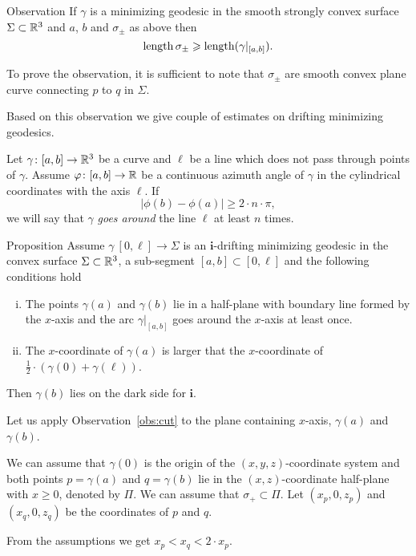 \documentclass[a4paper,10pt]{article}
\begin{document}
\begin{thm}{Observation}\label{obs:cut}
If $\gamma$ is a minimizing geodesic in the smooth strongly convex surface $\Sigma\subset \mathbb{R}^3$ and $a$, $b$ and $\sigma_\pm$ as above then
\[\mathop{\rm length}\nolimits\sigma_\pm\geqslant\mathop{\rm length}\nolimits(\gamma|_{[a,b]}).\]
\end{thm}

To prove the observation, it is sufficient to note that $\sigma_\pm$ are  smooth convex plane curve connecting $p$ to $q$ in $\Sigma$.

Based on this observation we give couple of estimates on drifting minimizing geodesics.

Let $\gamma\colon[a,b]\to\mathbb{R}^3$ be a curve and $\ell$ be a line which does not pass through points of $\gamma$.
Assume $\varphi\colon[a,b]\to\mathbb{R}$ be a continuous azimuth angle
of $\gamma$ in the cylindrical coordinates with the axis $\ell$.
If 
\[|\phi(b)-\phi(a)|\ge 2\cdot n\cdot\pi,\]
we will say that $\gamma$ \emph{goes around} the line $\ell$
at least $n$ times.

\begin{thm}{Proposition}\label{prop:around-once}
Assume $\gamma\:[0,\ell]\to \Sigma$ is an $\bm{i}$-drifting minimizing geodesic in the convex surface $\Sigma\subset \mathbb{R}^3$, a sub-segment $[a,b]\subset [0,\ell]$ and the following conditions hold
\begin{enumerate}[(i)]
\item The points $\gamma(a)$ and $\gamma(b)$ lie in a half-plane with boundary line formed by the $x$-axis
and  the arc $\gamma|_{[a,b]}$ goes around the $x$-axis at least once.
\item  The $x$-coordinate of $\gamma(a)$ is larger that the $x$-coordinate of $\tfrac12\cdot(\gamma(0)+\gamma(\ell))$.
\end{enumerate}
Then  $\gamma(b)$ lies on the dark side for $\bm{i}$.
\end{thm}

Let us apply Observation~\ref{obs:cut} to the plane containing $x$-axis, $\gamma(a)$ and $\gamma(b)$.


We can assume that $\gamma(0)$ is the origin of the $(x,y,z)$-coordinate system
and both points $p=\gamma(a)$ and $q=\gamma(b)$ lie in the $(x,z)$-coordinate half-plane with $x\ge 0$, denoted by $\Pi$.
We can assume that $\sigma_+\subset \Pi$.
Let $(x_p,0,z_p)$ and $(x_q,0,z_q)$ be the coordinates of $p$ and $q$.

From the assumptions we get $x_p<x_q<2\cdot x_p$.
\end{document}
